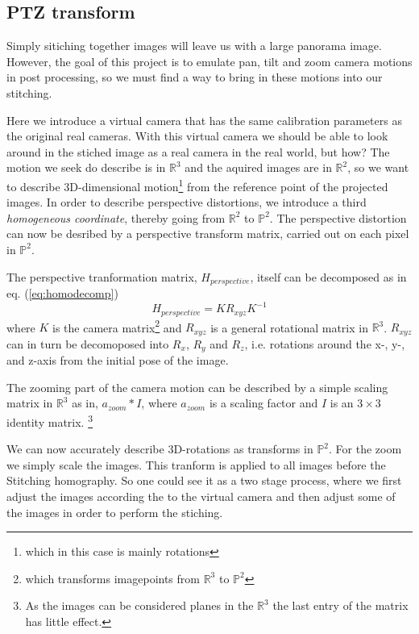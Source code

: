 \subsection{PTZ transform}
	Simply sitiching together images will leave us with a large panorama image. However, the goal of this project is to emulate pan, tilt and zoom camera motions in post processing, so we must find a way to bring in these motions into our stitching. 

	Here we introduce a virtual camera that has the same calibration parameters as the original real cameras. With this virtual camera we should be able to look around in the stiched image as a real camera in the real world, but how? The motion we seek do describe is in $\mathbb{R}^3$ and the aquired images are in $\mathbb{R}^2$, so we want to describe 3D-dimensional motion\footnote{which in this case is mainly rotations} from the reference point of the projected images. In order to describe perspective distortions, we introduce a third \emph{homogeneous coordinate}, thereby going from $\mathbb{R}^2$ to $\mathbb{P}^2$. The perspective distortion can now be desribed by a perspective transform matrix, carried out on each pixel in $\mathbb{P}^2$.

	The perspective tranformation matrix, $H_{perspective}$, itself can be decomposed as in eq. (\ref{eq:homodecomp}) 
	\begin{equation}
		H_{perspective}=KR_{xyz}K^{-1}
		\label{eq:homodecomp}
	\end{equation}
	where $K$ is the camera matrix\footnote{which transforms imagepoints from $\mathbb{R}^3$ to $\mathbb{P}^2$} and $R_{xyz}$ is a general rotational matrix in $\mathbb{R}^3$. 
$R_{xyz}$ can in turn be decomoposed into $R_x$, $R_y$ and $R_z$, i.e. rotations around the x-, y-, and z-axis from the initial pose of the image.

	The zooming part of the camera motion can be described by a simple scaling matrix in $\mathbb{R}^3$ as in, $a_{zoom}*I$, where $a_{zoom}$ is a scaling factor and $I$ is an $3 \times 3$ identity matrix. \footnote{As the images can be considered planes in the $\mathbb{R}^3$ the last entry of the matrix has little effect.}

	We can now accurately describe 3D-rotations as transforms in $\mathbb{P}^2$. For the zoom we simply scale the images. This tranform is applied to all images before the Stitching homography. So one could see it as a two stage process, where we first adjust the images according the to the virtual camera and then adjust some of the images in order to perform the stiching. 
